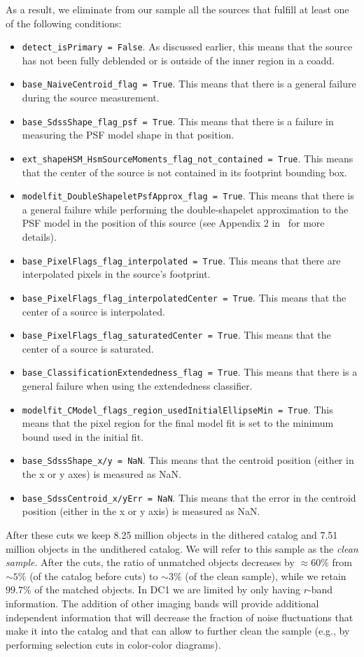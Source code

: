 \documentclass[\docopts]{\docclass}
\begin{document}
As a result, we eliminate from our sample all the sources that fulfill at least one of the following conditions:
\begin{itemize}
\item \texttt{detect\_isPrimary = False}. As discussed earlier, this means that the source has not been fully deblended or is outside of the inner region in a coadd.
\item \texttt{base\_NaiveCentroid\_flag = True}. This means that there is a general failure during the source measurement.
\item \texttt{base\_SdssShape\_flag\_psf = True}. This means that there is a failure in measuring the PSF model shape in that position.
\item \texttt{ext\_shapeHSM\_HsmSourceMoments\_flag\_not\_contained = True}. This means that the center of the source is not contained in its footprint bounding box.
\item \texttt{modelfit\_DoubleShapeletPsfApprox\_flag = True}. This means that there is a general failure while performing the double-shapelet approximation to the PSF model in the position of this source (see Appendix 2 in~\citet{2018PASJ...70S...5B} for more details).
\item \texttt{base\_PixelFlags\_flag\_interpolated = True}. This means that there are interpolated pixels in the source's footprint.
\item \texttt{base\_PixelFlags\_flag\_interpolatedCenter = True}. This means that the center of a source is interpolated.
\item \texttt{base\_PixelFlags\_flag\_saturatedCenter = True}. This means that the center of a source is saturated.
\item \texttt{base\_ClassificationExtendedness\_flag = True}. This means that there is a general failure when using the extendedness classifier.
\item \texttt{modelfit\_CModel\_flags\_region\_usedInitialEllipseMin = True}. This means that the pixel region for the final model fit is set to the minimum bound used in the initial fit.
\item \texttt{base\_SdssShape\_x/y = NaN}. This means that the centroid position (either in the x or y axes) is measured as NaN.
\item \texttt{base\_SdssCentroid\_x/yErr = NaN}. This means that the error in the centroid position (either in the x or y axis) is measured as NaN.
\end{itemize}

After these cuts we keep 8.25 million objects in the dithered catalog and 7.51 million objects in the undithered catalog. We will refer to this sample as the \textit{clean sample}. After the cuts, the ratio of unmatched objects decreases by $\approx 60\%$ from $\sim 5\%$ (of the catalog before cuts) to $\sim 3\%$ (of the clean sample), while we retain $99.7\%$ of the matched objects. In DC1 we are limited by only having $r$-band information. The addition of other imaging bands will provide additional independent information that will decrease the fraction of noise fluctuations that make it into the catalog and that can allow to further clean the sample (e.g., by performing selection cuts in color-color diagrams).
\end{document}
